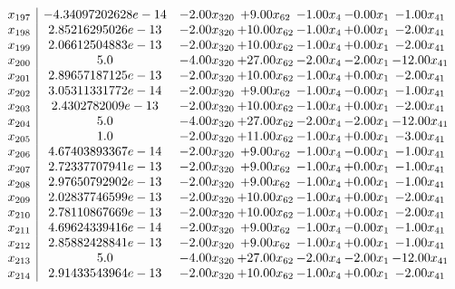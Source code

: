 \documentclass[8pt]{article}
\begin{document}
\[\begin{array}{c| c c@{\hskip 2pt} c@{\hskip 2pt} c@{\hskip 2pt} c@{\hskip 2pt} c@{\hskip 2pt} }
 x_{197}   &  -4.34097202628e-14 & -2.00 x_{320} & +  9.00 x_{62} & -1.00 x_{4} & -0.00 x_{1} & -1.00 x_{41}\\
 x_{198}   &  2.85216295026e-13 & -2.00 x_{320} & + 10.00 x_{62} & -1.00 x_{4} & +  0.00 x_{1} & -2.00 x_{41}\\
 x_{199}   &  2.06612504883e-13 & -2.00 x_{320} & + 10.00 x_{62} & -1.00 x_{4} & +  0.00 x_{1} & -2.00 x_{41}\\
 x_{200}   &  5.0 & -4.00 x_{320} & + 27.00 x_{62} & -2.00 x_{4} & -2.00 x_{1} & -12.00 x_{41}\\
 x_{201}   &  2.89657187125e-13 & -2.00 x_{320} & + 10.00 x_{62} & -1.00 x_{4} & +  0.00 x_{1} & -2.00 x_{41}\\
 x_{202}   &  3.05311331772e-14 & -2.00 x_{320} & +  9.00 x_{62} & -1.00 x_{4} & -0.00 x_{1} & -1.00 x_{41}\\
 x_{203}   &  2.4302782009e-13 & -2.00 x_{320} & + 10.00 x_{62} & -1.00 x_{4} & +  0.00 x_{1} & -2.00 x_{41}\\
 x_{204}   &  5.0 & -4.00 x_{320} & + 27.00 x_{62} & -2.00 x_{4} & -2.00 x_{1} & -12.00 x_{41}\\
 x_{205}   &  1.0 & -2.00 x_{320} & + 11.00 x_{62} & -1.00 x_{4} & +  0.00 x_{1} & -3.00 x_{41}\\
 x_{206}   &  4.67403893367e-14 & -2.00 x_{320} & +  9.00 x_{62} & -1.00 x_{4} & -0.00 x_{1} & -1.00 x_{41}\\
 x_{207}   &  2.72337707941e-13 & -2.00 x_{320} & +  9.00 x_{62} & -1.00 x_{4} & +  0.00 x_{1} & -1.00 x_{41}\\
 x_{208}   &  2.97650792902e-13 & -2.00 x_{320} & +  9.00 x_{62} & -1.00 x_{4} & +  0.00 x_{1} & -1.00 x_{41}\\
 x_{209}   &  2.02837746599e-13 & -2.00 x_{320} & + 10.00 x_{62} & -1.00 x_{4} & +  0.00 x_{1} & -2.00 x_{41}\\
 x_{210}   &  2.78110867669e-13 & -2.00 x_{320} & + 10.00 x_{62} & -1.00 x_{4} & +  0.00 x_{1} & -2.00 x_{41}\\
 x_{211}   &  4.69624339416e-14 & -2.00 x_{320} & +  9.00 x_{62} & -1.00 x_{4} & -0.00 x_{1} & -1.00 x_{41}\\
 x_{212}   &  2.85882428841e-13 & -2.00 x_{320} & +  9.00 x_{62} & -1.00 x_{4} & +  0.00 x_{1} & -1.00 x_{41}\\
 x_{213}   &  5.0 & -4.00 x_{320} & + 27.00 x_{62} & -2.00 x_{4} & -2.00 x_{1} & -12.00 x_{41}\\
 x_{214}   &  2.91433543964e-13 & -2.00 x_{320} & + 10.00 x_{62} & -1.00 x_{4} & +  0.00 x_{1} & -2.00 x_{41}\\

\end{array}\]
\end{document}
